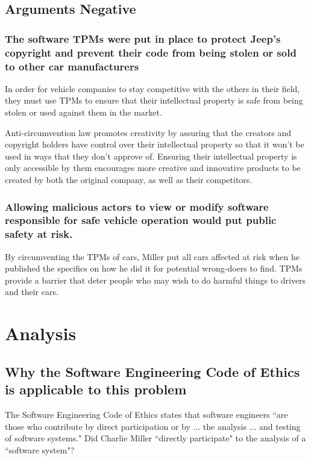 \documentclass[12pt]{article}
\begin{document}
\begin{multicols}{2}
\subsection{Arguments Negative}

\subsubsection{The software TPMs were put in place to protect Jeep's copyright and prevent their code from being stolen or sold to other car manufacturers}

In order for vehicle companies to stay competitive with the others in their field, they must use TPMs to ensure that their intellectual property is safe from being stolen or used against them in the market. \cite{chris}

Anti-circumvention law promotes creativity by assuring that the creators and copyright holders have control over their intellectual property so that it won't be used in ways that they don't approve of.\cite{chris} Ensuring their intellectual property is only accessible by them encourages more creative and innovative products to be created by both the original company, as well as their competitors. \cite{chris}
 
\subsubsection{Allowing malicious actors to view or modify software responsible for safe vehicle operation would put public safety at risk.}

By circumventing the TPMs of cars, Miller put all cars affected at risk when he published the specifics on how he did it\cite{officialPaper} for potential wrong-doers to find.
TPMs provide a barrier that deter people who may wish to do harmful things to drivers and their cars. \cite{chris} 

\section{Analysis}

\subsection{Why the Software Engineering Code of Ethics is applicable to this problem}

The Software Engineering Code of Ethics states that software engineers ``are those who contribute by direct participation or by ... the analysis ... and testing of software systems."\cite{seCode} Did Charlie Miller ``directly participate" to the analysis of a ``software system"?


\end{multicols}
\end{document}
